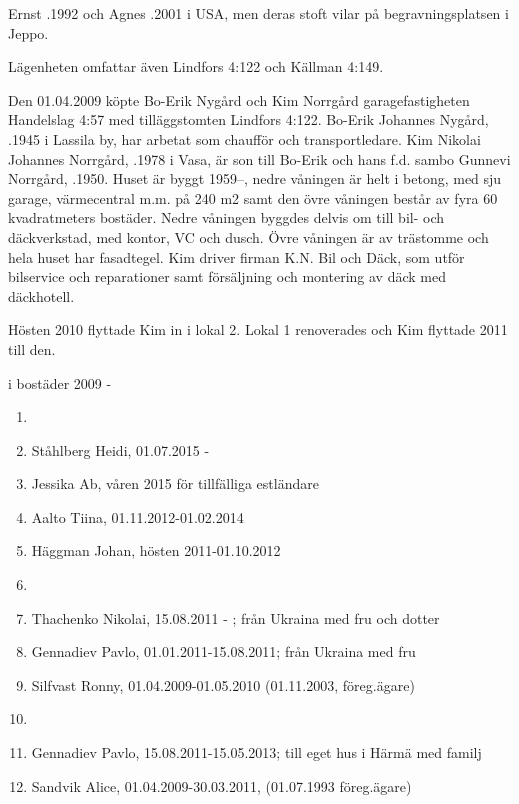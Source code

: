 Ernst .1992 och Agnes .2001 i USA, men deras stoft vilar på begravningsplatsen i Jeppo.




Lägenheten omfattar även Lindfors 4:122 och Källman 4:149.


Den 01.04.2009 köpte Bo-Erik Nygård och Kim Norrgård garagefastigheten Handelslag 4:57 med tilläggstomten Lindfors 4:122. Bo-Erik Johannes Nygård, .1945 i Lassila by, har arbetat som chaufför och transportledare. Kim Nikolai Johannes Norrgård, .1978 i Vasa, är son till Bo-Erik och hans f.d. sambo Gunnevi Norrgård, .1950. Huset är byggt 1959--, nedre våningen är helt i betong, med sju garage, värmecentral m.m. på 240 m2 samt den övre våningen består av fyra 60 kvadratmeters bostäder. Nedre våningen byggdes delvis om till bil- och däckverkstad, med kontor, VC och dusch. Övre våningen är av trästomme och hela huset har fasadtegel. Kim driver firman K.N. Bil och Däck, som utför bilservice och 	reparationer samt försäljning och montering av däck med däckhotell.

Hösten 2010 flyttade Kim in i lokal 2. Lokal 1 renoverades och Kim flyttade 2011 till den.

 i bostäder 2009 -
\begin{enumerate}
  \item {}
  \item Ståhlberg Heidi,	01.07.2015 -
  \item Jessika Ab, våren 2015 för tillfälliga estländare
  \item Aalto Tiina, 01.11.2012-01.02.2014
  \item Häggman Johan,	hösten 2011-01.10.2012
  \item {}
  \item Thachenko Nikolai, 15.08.2011 - ; från Ukraina	med fru och dotter
  \item Gennadiev Pavlo,	01.01.2011-15.08.2011; från Ukraina	med fru
  \item Silfvast Ronny,	01.04.2009-01.05.2010 (01.11.2003, föreg.ägare)
  \item {}
  \item Gennadiev Pavlo, 15.08.2011-15.05.2013; till eget hus i Härmä med familj
  \item Sandvik Alice,	01.04.2009-30.03.2011, (01.07.1993 föreg.ägare)
\end{enumerate}

